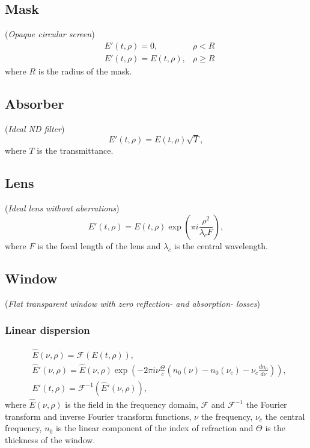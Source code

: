 \documentclass{report}
\begin{document}
\subsection*{Mask}
(\textit{Opaque circular screen})
\begin{align*}
&E'(t,\rho) = 0, &\rho < R\\
&E'(t,\rho) = E(t,\rho), &\rho \geq R
\end{align*}
where $R$ is the radius of the mask.

\subsection*{Absorber}
(\textit{Ideal ND filter})
\begin{equation*}
E'(t,\rho) = E(t,\rho) \sqrt{T},
\end{equation*}
where $T$ is the transmittance.

\subsection*{Lens}
(\textit{Ideal lens without aberrations})
\begin{equation*}
E'(t,\rho) = E(t,\rho) \exp\left( \pi i \frac{\rho^2}{\lambda_c F} \right),
\end{equation*}
where $F$ is the focal length of the lens and $\lambda_c$ is the central wavelength.

\subsection*{Window}
(\textit{Flat transparent window with zero reflection- and absorption- losses})
\subsubsection*{Linear dispersion}
\begin{align*}
&\widehat{E}(\nu,\rho) = \mathcal{F}(E(t,\rho)),\\
&\widehat{E}'(\nu,\rho) = \widehat{E}(\nu,\rho) \exp \left( - 2 \pi i \nu \frac{\Theta}{c} \left(n_0(\nu)-n_0(\nu_c) -\nu_c \frac{d n_0}{d\nu}\right) \right),\\
&E'(t,\rho) = \mathcal{F}^{-1}(\widehat{E}'(\nu,\rho)),
\end{align*}
where $\widehat{E}(\nu,\rho)$ is the field in the frequency domain, $\mathcal{F}$ and $\mathcal{F}^{-1}$ the Fourier transform and inverse Fourier transform functions, $\nu$ the frequency, $\nu_c$ the central frequency, $n_0$ is the linear component of the index of refraction and $\Theta$ is the thickness of the window.
\end{document}
